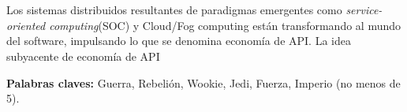 \chapter*{\runtitulo}

Los sistemas distribuidos resultantes de paradigmas emergentes como \emph{service-oriented computing}(SOC) y Cloud/Fog computing están transformando al mundo del software, impulsando lo que se denomina economía de API. La idea subyacente de economía de API

\bigskip

\noindent\textbf{Palabras claves:} Guerra, Rebelión, Wookie, Jedi, Fuerza, Imperio (no menos de 5).